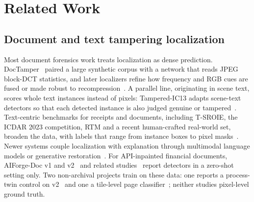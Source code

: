 \section{Related Work}
\label{sec:related}

\subsection{Document and text tampering localization}
Most document forensics work treats localization as dense prediction. DocTamper~\cite{qu2023doctamper} paired a large synthetic corpus with a network that reads JPEG block-DCT statistics, and later localizers refine how frequency and RGB cues are fused or made robust to recompression~\cite{chen2024ffdn,wong2025adcdnet,dhouib2026diffnet,docqt2026,ctpnet2023,song2024caftbnet,dong2024tce,li2025ditl2}. A parallel line, originating in scene text, scores whole text instances instead of pixels: Tampered-IC13 adapts scene-text detectors so that each detected instance is also judged genuine or tampered~\cite{wang2022tamperedic13,qu2025ostf}. Text-centric benchmarks for receipts and documents, including T-SROIE, the ICDAR 2023 competition, RTM and a recent human-crafted real-world set, broaden the data, with labels that range from instance boxes to pixel masks~\cite{wang2022tsroie,luo2023icdar,luo2025rtm,xu2026realitygap}. Newer systems couple localization with explanation through multimodal language models or generative restoration~\cite{qu2024textsleuth,qu2026textshieldr1,zeng2026docshield,zhang2026scrf,gentextforensics2026}. For API-inpainted financial documents, AIForge-Doc v1 and v2~\cite{wu2026aiforgedoc,wu2026aiforgedocv2} and related studies~\cite{zhao2026docforgebench,zhang2026gpt4oreceipt,mllmdoc2025,textfake2026,raj2026images25} report detectors in a zero-shot setting only. Two non-archival projects train on these data: one reports a process-twin control on v2~\cite{helali2026processtwin} and one a tile-level page classifier~\cite{leong2026docdet}; neither studies pixel-level ground truth.

